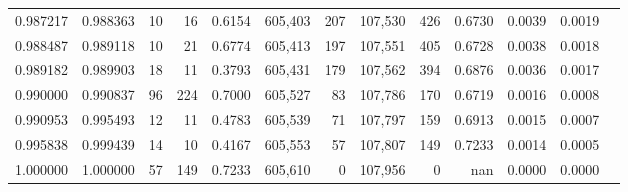 \begin{tabular}{rrrrrrrrrrrrr}
0.987217 & 0.988363 &    10 &  16 &                                     0.6154 & 605,403 &     207 & 107,530 &     426 & 0.6730 & 0.0039 & 0.0019 \\
0.988487 & 0.989118 &    10 &  21 &                                     0.6774 & 605,413 &     197 & 107,551 &     405 & 0.6728 & 0.0038 & 0.0018 \\
0.989182 & 0.989903 &    18 &  11 &                                     0.3793 & 605,431 &     179 & 107,562 &     394 & 0.6876 & 0.0036 & 0.0017 \\
0.990000 & 0.990837 &    96 & 224 &                                     0.7000 & 605,527 &      83 & 107,786 &     170 & 0.6719 & 0.0016 & 0.0008 \\
0.990953 & 0.995493 &    12 &  11 &                                     0.4783 & 605,539 &      71 & 107,797 &     159 & 0.6913 & 0.0015 & 0.0007 \\
0.995838 & 0.999439 &    14 &  10 &                                     0.4167 & 605,553 &      57 & 107,807 &     149 & 0.7233 & 0.0014 & 0.0005 \\
1.000000 & 1.000000 &    57 & 149 &                                     0.7233 & 605,610 &       0 & 107,956 &       0 &    nan & 0.0000 & 0.0000 \\
\bottomrule
\end{tabular}
